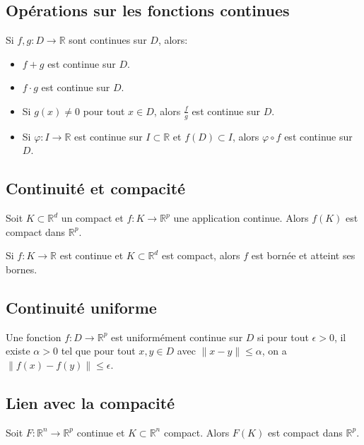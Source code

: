 \documentclass[oneside]{book}
\begin{document}
\subsection{Opérations sur les fonctions continues}
Si $f, g: D \rightarrow \mathbb{R}$ sont continues sur $D$, alors:
\begin{itemize}
    \item $f + g$ est continue sur $D$.
    \item $f \cdot g$ est continue sur $D$.
    \item Si $g(x) \neq 0$ pour tout $x \in D$, alors $\frac{f}{g}$ est continue sur $D$.
    \item Si $\varphi: I \rightarrow \mathbb{R}$ est continue sur $I \subset \mathbb{R}$ et $f(D) \subset I$, alors $\varphi \circ f$ est continue sur $D$.
\end{itemize}

\subsection{Continuité et compacité}

\begin{theorem}
Soit $K \subset \mathbb{R}^d$ un compact et $f: K \rightarrow \mathbb{R}^p$ une application continue.
Alors $f(K)$ est compact dans $\mathbb{R}^p$.
\end{theorem}

\begin{proposition}
Si $f: K \rightarrow \mathbb{R}$ est continue et $K \subset \mathbb{R}^d$ est compact, alors $f$ est bornée et atteint ses bornes.
\end{proposition}

\subsection{Continuité uniforme}
\begin{definition}
Une fonction $f: D \rightarrow \mathbb{R}^p$ est uniformément continue sur $D$ si pour tout $\epsilon > 0$, il existe $\alpha > 0$ tel que pour tout $x, y \in D$ avec $\|x - y\| \leq \alpha$, on a $\|f(x) - f(y)\| \leq \epsilon$.
\end{definition}

\subsection{Lien avec la compacité}

\begin{theorem}
Soit $F: \mathbb{R}^n \rightarrow \mathbb{R}^p$ continue et $K \subset \mathbb{R}^n$ compact. Alors $F(K)$ est compact dans $\mathbb{R}^p$.
\end{theorem}
\end{document}
